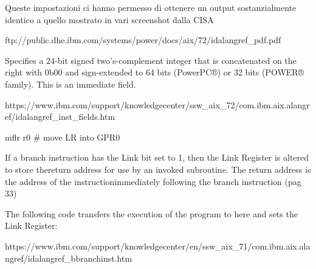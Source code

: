 \documentclass[10pt,a4paper, titlepage]{report}
\begin{document}
Queste impostazioni ci hanno permesso di ottenere un output sostanzialmente identico a quello mostrato in vari screenshot dalla CISA




ftp://public.dhe.ibm.com/systems/power/docs/aix/72/idalangref\_pdf.pdf



    
 	Specifies a 24-bit signed two's-complement integer that is concatenated on the right with 0b00 and sign-extended to 64 bits (PowerPC®) or 32 bits (POWER® family). This is an immediate field.

 	https://www.ibm.com/support/knowledgecenter/ssw\_aix\_72/com.ibm.aix.alangref/idalangref\_inst\_fields.htm
 	
 	mflr r0 \# move LR into GPR0
 	
 	 If a branch instruction has the Link bit set to 1, then the Link Register is altered to store thereturn address for use by an invoked subroutine. The return address is the address of the instructionimmediately following the branch instruction (pag 33)


The following code transfers the execution of the program to here and sets the Link Register: 

https://www.ibm.com/support/knowledgecenter/en/ssw\_aix\_71/com.ibm.aix.alangref/idalangref\_bbranchinst.htm


\listoffigures
\listoftables
\lstlistoflistings
\end{document}
